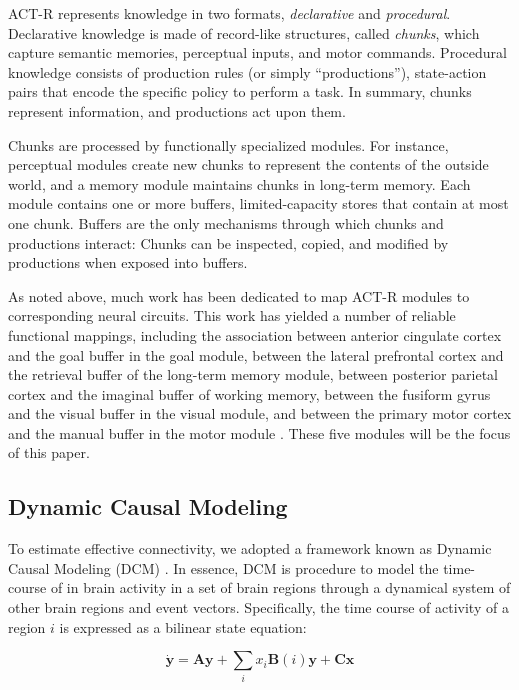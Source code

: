 \documentclass[10pt,letterpaper]{article}
\newcommand{\vct}[1]{\boldsymbol{#1}} %
\newcommand{\mat}[1]{\boldsymbol{#1}} %
\begin{document}
ACT-R represents knowledge in two formats, {\it declarative} and {\it procedural}. Declarative knowledge is made of record-like structures, called {\it chunks}, which capture semantic memories, perceptual inputs, and motor commands. Procedural knowledge consists of production rules (or simply ``productions''), state-action pairs that encode the specific policy to perform a task. In summary, chunks represent information, and productions act upon them.

Chunks are processed by functionally specialized modules. For instance, perceptual modules create new chunks to represent the contents of the outside world, and a memory module maintains chunks in long-term memory. Each module contains one or more buffers, limited-capacity stores that contain at most one chunk. Buffers are the only mechanisms through which chunks and productions interact: Chunks can be inspected, copied, and modified by productions when exposed into buffers. 

As noted above, much work has been dedicated to map ACT-R modules to corresponding neural circuits. This work has yielded a number of reliable functional mappings, including the association between anterior cingulate cortex and the goal buffer in the goal module, between the lateral prefrontal cortex and the retrieval buffer of the long-term memory module, between posterior parietal cortex and the imaginal buffer of working memory, between the fusiform gyrus and the visual buffer in the visual module, and between the primary motor cortex and the manual buffer in the motor module \cite{fincham2006distinct,sohn2007anticipation,danker2008rational,Anderson2004,Anderson2008}. These five modules will be the focus of this paper.

\subsection{Dynamic Causal Modeling}

To estimate effective connectivity, we adopted a framework known as Dynamic Causal Modeling (DCM) \cite{Friston2003}. In essence, DCM is procedure to model the time-course of in brain activity in a set of brain regions through a dynamical system of other brain regions and event vectors. Specifically, the time course of activity of a region $i$ is expressed as a bilinear state equation:

\begin{equation}
\dot{\vct{y}} = \mat{A}\vct{y} + \sum_{i}x_i\mat{B}(i)\vct{y} + \mat{C}\vct{x}
\label{DCMEquation}
\end{equation}
\end{document}
